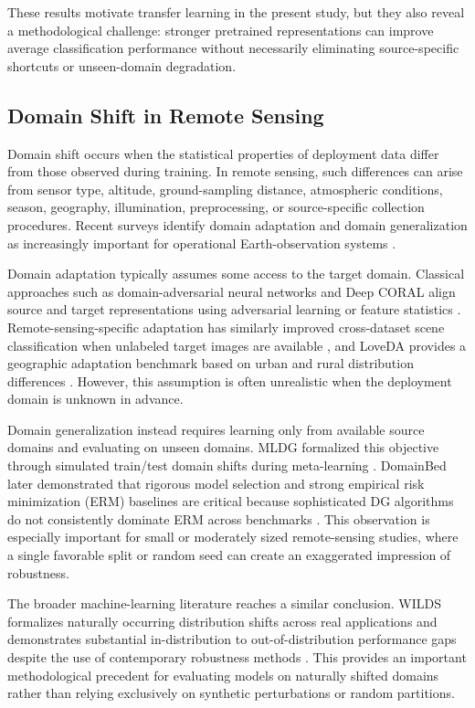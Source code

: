 These results motivate transfer learning in the present study, but they also reveal a methodological challenge: stronger pretrained representations can improve average classification performance without necessarily eliminating source-specific shortcuts or unseen-domain degradation.

\subsection{Domain Shift in Remote Sensing}

Domain shift occurs when the statistical properties of deployment data differ from those observed during training. In remote sensing, such differences can arise from sensor type, altitude, ground-sampling distance, atmospheric conditions, season, geography, illumination, preprocessing, or source-specific collection procedures. Recent surveys identify domain adaptation and domain generalization as increasingly important for operational Earth-observation systems \cite{peng2022dasurvey,zhou2023dgsurvey,liao2026dgsurvey}.

Domain adaptation typically assumes some access to the target domain. Classical approaches such as domain-adversarial neural networks and Deep CORAL align source and target representations using adversarial learning or feature statistics \cite{ganin2016dann,sun2016deepcoral}. Remote-sensing-specific adaptation has similarly improved cross-dataset scene classification when unlabeled target images are available \cite{liu2020adabdc}, and LoveDA provides a geographic adaptation benchmark based on urban and rural distribution differences \cite{wang2021loveda}. However, this assumption is often unrealistic when the deployment domain is unknown in advance.

Domain generalization instead requires learning only from available source domains and evaluating on unseen domains. MLDG formalized this objective through simulated train/test domain shifts during meta-learning \cite{li2018mldg}. DomainBed later demonstrated that rigorous model selection and strong empirical risk minimization (ERM) baselines are critical because sophisticated DG algorithms do not consistently dominate ERM across benchmarks \cite{gulrajani2021domainbed}. This observation is especially important for small or moderately sized remote-sensing studies, where a single favorable split or random seed can create an exaggerated impression of robustness.

The broader machine-learning literature reaches a similar conclusion. WILDS formalizes naturally occurring distribution shifts across real applications and demonstrates substantial in-distribution to out-of-distribution performance gaps despite the use of contemporary robustness methods \cite{koh2021wilds}. This provides an important methodological precedent for evaluating models on naturally shifted domains rather than relying exclusively on synthetic perturbations or random partitions.


